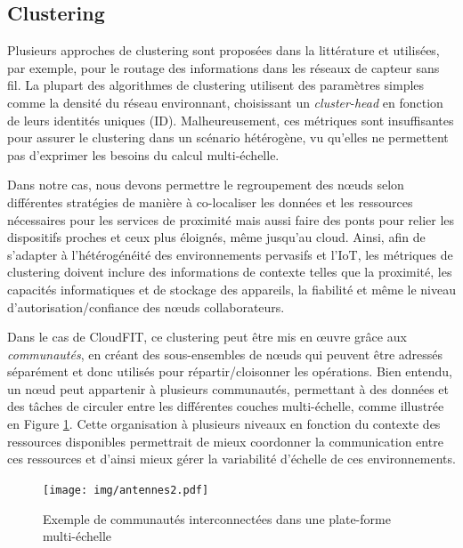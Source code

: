 \subsection{Clustering}

Plusieurs approches de clustering sont proposées dans la littérature \cite{Johnen2011} et utilisées, par exemple, pour  le routage des informations dans les réseaux de capteur sans fil. La plupart des algorithmes de clustering utilisent des paramètres simples comme la densité du réseau environnant, choisissant un \textit{cluster-head} en fonction de leurs identités uniques (ID). Malheureusement, ces métriques sont insuffisantes pour assurer le clustering dans un scénario hétérogène, vu qu'elles ne permettent pas d'exprimer les besoins du calcul multi-échelle. 

Dans notre cas, nous devons permettre le regroupement des n{\oe}uds selon différentes stratégies de manière à co-localiser les données et les ressources nécessaires pour les services de proximité mais aussi faire des ponts pour relier les dispositifs proches et ceux plus éloignés, même jusqu'au cloud. Ainsi, afin de s'adapter à l'hétérogénéité des environnements pervasifs et l'IoT, les métriques de clustering doivent inclure des informations de contexte telles que la proximité, les capacités informatiques et de stockage des appareils, la fiabilité et même le niveau d'autorisation/confiance des n{\oe}uds collaborateurs.
 
Dans le cas de CloudFIT, ce clustering peut être mis en {\oe}uvre grâce aux \textit{communautés}, en créant des sous-ensembles de n{\oe}uds qui peuvent être adressés séparément et donc utilisés pour répartir/cloisonner les opérations. Bien entendu, un n{\oe}ud peut appartenir à plusieurs communautés, permettant à des données et des tâches de circuler entre les différentes couches multi-échelle, comme illustrée en Figure \ref{fig:antennes}. Cette organisation à plusieurs niveaux en fonction du contexte des ressources disponibles permettrait de mieux coordonner la communication entre ces ressources et d'ainsi mieux gérer la variabilité d'échelle de ces environnements. 

 
 \begin{figure}[!ht]
 	\centering
 	\texttt{[image: img/antennes2.pdf]}
 	\caption{Exemple de communautés interconnectées dans une plate-forme multi-échelle}
 	\label{fig:antennes}
 \end{figure}

